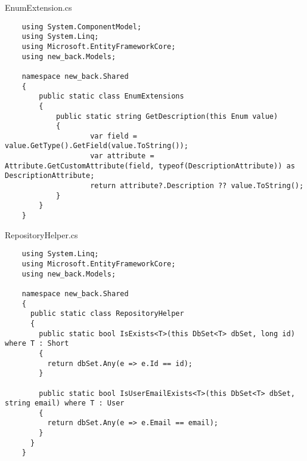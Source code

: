 EnumExtension.cs
\lstset{style=sharpc}
\begin{lstlisting}
    using System.ComponentModel;
    using System.Linq;
    using Microsoft.EntityFrameworkCore;
    using new_back.Models;
    
    namespace new_back.Shared
    {
        public static class EnumExtensions
        {
            public static string GetDescription(this Enum value)
            {
                    var field = value.GetType().GetField(value.ToString());
                    var attribute = Attribute.GetCustomAttribute(field, typeof(DescriptionAttribute)) as DescriptionAttribute;
                    return attribute?.Description ?? value.ToString();
            }
        }
    }
\end{lstlisting}

RepositoryHelper.cs
\lstset{style=sharpc}
\begin{lstlisting}
    using System.Linq;
    using Microsoft.EntityFrameworkCore;
    using new_back.Models;
    
    namespace new_back.Shared
    {
      public static class RepositoryHelper
      {
        public static bool IsExists<T>(this DbSet<T> dbSet, long id) where T : Short
        {
          return dbSet.Any(e => e.Id == id);
        }
        
        public static bool IsUserEmailExists<T>(this DbSet<T> dbSet, string email) where T : User
        {
          return dbSet.Any(e => e.Email == email);
        }
      }
    }
\end{lstlisting}

